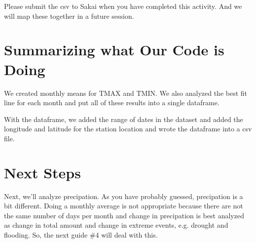 \documentclass{article}\usepackage[]{graphicx}\usepackage[]{color}
\begin{document}
Please submit the csv to Sakai when you have completed this activity. And we will map these together in a future session.

\section{Summarizing what Our Code is Doing}

We created monthly means for TMAX and TMIN. We also analyzed the best fit line for each month and put all of these results into a single dataframe. 

With the dataframe, we added the range of dates in the dataset and added the longitude and latitude for the station location and wrote the dataframe into a csv file. 

\section{Next Steps}

Next, we'll analyze precipation. As you have probably guessed, precipation is a bit different. Doing a monthly average is not appropriate because there are not the same number of days per month and change in precipation is best analyzed as change in total amount and change in extreme events, e.g. drought and flooding. So, the next guide \#4 will deal with this.
\end{document}
